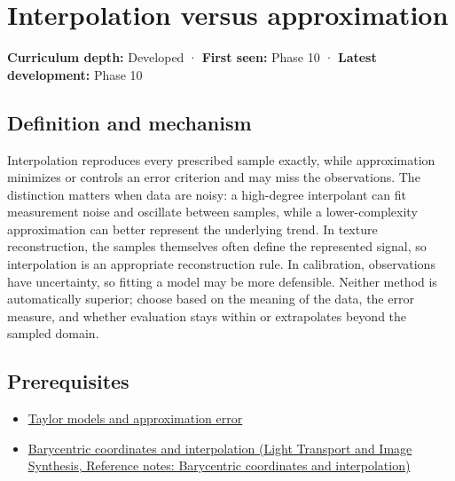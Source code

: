 \hypertarget{appendix-0c2a5f69851e}{}\label{referencestart:appendix-0c2a5f69851e}
\section{Interpolation versus approximation}\label{appendix-0c2a5f69851e-interpolation-versus-approximation}

\hypertarget{appendix-0c2a5f69851e-interpolation-versus-approximation}{}

\textbf{Curriculum depth:} Developed · \textbf{First seen:} Phase 10 · \textbf{Latest development:} Phase 10

\begin{allmightroledefinition}

\subsection{Definition and mechanism}\label{appendix-0c2a5f69851e-definition-and-mechanism}

\hypertarget{appendix-0c2a5f69851e-definition-and-mechanism}{}

Interpolation reproduces every prescribed sample exactly, while approximation minimizes or controls an error criterion and may miss the observations. The distinction matters when data are noisy: a high-degree interpolant can fit measurement noise and oscillate between samples, while a lower-complexity approximation can better represent the underlying trend. In texture reconstruction, the samples themselves often define the represented signal, so interpolation is an appropriate reconstruction rule. In calibration, observations have uncertainty, so fitting a model may be more defensible. Neither method is automatically superior; choose based on the meaning of the data, the error measure, and whether evaluation stays within or extrapolates beyond the sampled domain.

\end{allmightroledefinition}

\subsection{Prerequisites}\label{appendix-0c2a5f69851e-prerequisites}

\hypertarget{appendix-0c2a5f69851e-prerequisites}{}

\begin{itemize}
\tightlist
\item
  \hyperref[appendix-32f39e9a3738]{Taylor models and approximation error}
\item
  \href{../04-Light-Transport-and-Image-Synthesis/main.pdf\#nameddest=appendix-02b9d9a81dca}{Barycentric coordinates and interpolation (Light Transport and Image Synthesis, Reference notes: Barycentric coordinates and interpolation)}
\end{itemize}

